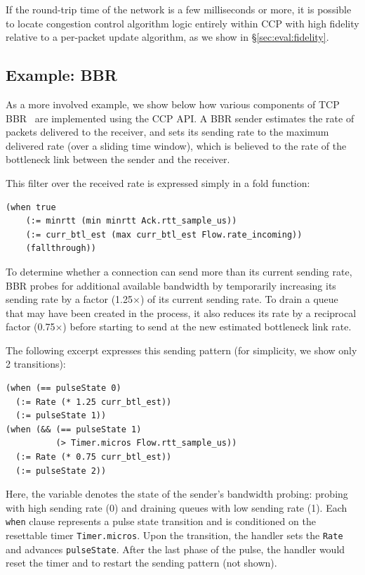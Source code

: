 If the round-trip time of the network is a few milliseconds or more,
it is possible to locate congestion control algorithm logic entirely within CCP
with high fidelity relative to a per-packet update algorithm, as we show in \S\ref{sec:eval:fidelity}.

\subsection{Example: BBR}
\label{s:ccp:bbr}
As a more involved example, we show below
how various components of TCP BBR~\cite{bbr} are implemented using the CCP API.
A BBR sender estimates the rate of packets delivered to the receiver, and sets
its sending rate to the maximum delivered rate (over a sliding time
window), which is believed to the rate of the bottleneck link between the sender
and the receiver.

This filter over the received rate is expressed simply in a fold function:
{\footnotesize
\begin{verbatim}
(when true
    (:= minrtt (min minrtt Ack.rtt_sample_us))
    (:= curr_btl_est (max curr_btl_est Flow.rate_incoming))
    (fallthrough))
\end{verbatim}
}

To determine whether a connection can send more than its current sending rate,
BBR probes for additional available bandwidth by temporarily increasing its
sending rate by a factor (1.25$\times$) of its current sending rate.
%
To drain a queue that may have been created in the process, it also reduces its
rate by a reciprocal factor (0.75$\times$) before starting to send at the new estimated
bottleneck link rate.

The following excerpt expresses this sending pattern (for simplicity, we show only 2 transitions):
{\footnotesize
\begin{verbatim}
(when (== pulseState 0)
  (:= Rate (* 1.25 curr_btl_est))
  (:= pulseState 1))
(when (&& (== pulseState 1) 
          (> Timer.micros Flow.rtt_sample_us))
  (:= Rate (* 0.75 curr_btl_est))
  (:= pulseState 2))
\end{verbatim}
}

Here, the variable  denotes the state of the sender's
bandwidth probing: probing with high sending rate (0) and draining queues with low
sending rate (1).
Each \texttt{when} clause represents a pulse state transition and is conditioned on the
resettable timer \texttt{Timer.micros}.
Upon the transition, the handler sets the \texttt{Rate} and advances \texttt{pulseState}.
After the last phase of the pulse, the handler would reset the timer and  to restart the sending pattern (not shown).

